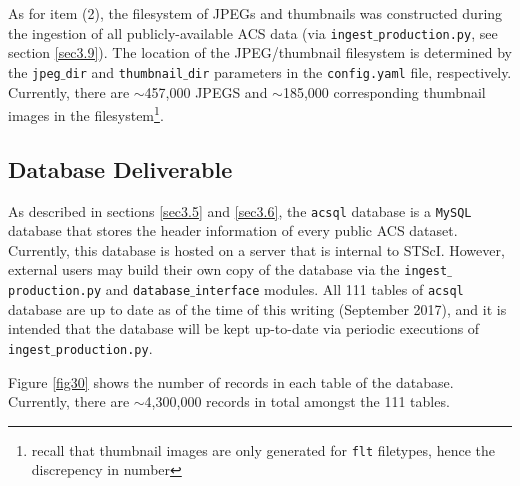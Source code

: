 \documentclass[10pt,journal,compsoc]{IEEEtran}
\begin{document}
As for item (2), the filesystem of JPEGs and thumbnails was constructed during the ingestion of all publicly-available ACS data (via \texttt{ingest$\_$production.py}, see section \ref{sec3.9}).
The location of the JPEG/thumbnail filesystem is determined by the \texttt{jpeg$\_$dir} and \texttt{thumbnail$\_$dir} parameters in the \texttt{config.yaml} file, respectively.
Currently, there are $\sim$457,000 JPEGS and $\sim$185,000 corresponding thumbnail images in the filesystem\footnote{recall that thumbnail images are only generated for \texttt{flt} filetypes,
hence the discrepency in number}.


\subsection{Database Deliverable} \label{sec4.2}

As described in sections \ref{sec3.5} and \ref{sec3.6}, the \texttt{acsql} database is a \texttt{MySQL} database that stores the header information of every public ACS dataset.  Currently,
this database is hosted on a server that is internal to STScI.  However, external users may build their own copy of the database via the \texttt{ingest$\_$production.py} and
\texttt{database$\_$interface} modules.  All 111 tables of \texttt{acsql} database are up to date as of the time of this writing (September 2017), and it is intended that the database will
be kept up-to-date via periodic executions of \texttt{ingest$\_$production.py}.

Figure \ref{fig30} shows the number of records in each table of the database.  Currently, there are $\sim$4,300,000 records in total amongst the 111 tables.
\end{document}

